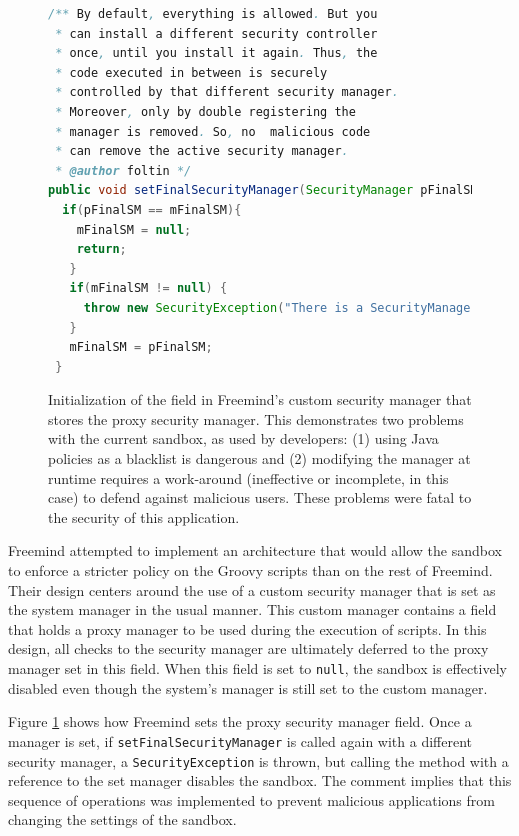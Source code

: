 \documentclass{sig-alternate}
\begin{document}
\begin{figure}
\begin{lstlisting}[language=Java,firstnumber=31]
/** By default, everything is allowed. But you
 * can install a different security controller
 * once, until you install it again. Thus, the
 * code executed in between is securely
 * controlled by that different security manager.  
 * Moreover, only by double registering the
 * manager is removed. So, no  malicious code 
 * can remove the active security manager.  
 * @author foltin */
public void setFinalSecurityManager(SecurityManager pFinalSM) {
  if(pFinalSM == mFinalSM){
    mFinalSM = null;
    return;
   } 		
   if(mFinalSM != null) {
     throw new SecurityException("There is a SecurityManager installed already."); 		
   } 		
   mFinalSM = pFinalSM;
 }	
\end{lstlisting}
\caption{Initialization of the field in Freemind's custom security
  manager\label{fig:Freemind-Security-Manager} that stores the proxy security
  manager. This demonstrates two problems with the current sandbox, as used by developers: (1) 
  using Java policies as a blacklist is
  dangerous and (2) modifying the manager at runtime requires 
  a work-around (ineffective or incomplete, in this case) to defend against malicious
  users. These problems were fatal to the security of this application.}
\end{figure}

Freemind attempted to implement an architecture that would allow the
sandbox to enforce a stricter policy on the Groovy scripts than on
the rest of Freemind. Their design centers around the use of a custom
security manager that is set as the system manager in the usual manner.
This custom manager contains a field that holds a proxy manager to be used during the execution of
scripts. In this design, all checks to the security manager are ultimately
deferred to the proxy manager set in this field. When
this field is set to \texttt{null}, the sandbox is effectively disabled
even though the system's manager is still set to the custom manager.

Figure \ref{fig:Freemind-Security-Manager} shows how Freemind sets
the proxy security manager field.
Once a manager is set, if \texttt{setFinalSecurityManager} is called
again with a different security manager, a \texttt{SecurityException}
is thrown, but calling the method with a reference to the set manager disables
the sandbox. The comment implies that this sequence
of operations was implemented to prevent malicious applications from
changing the settings of the sandbox.
\end{document}
